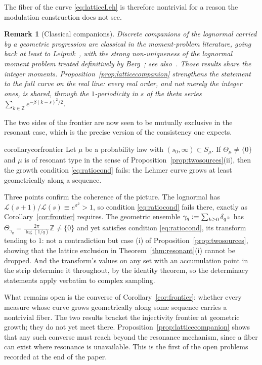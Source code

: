 \documentclass[sn-mathphys-num]{sn-jnl}
\theoremstyle{thmstyleone}%
\theoremstyle{thmstyletwo}%
\newtheorem{remark}{Remark}%
\theoremstyle{thmstylethree}%
\theoremstyle{thmstyleone}%
\providecommand{\Z}{\mathbb{Z}}
\providecommand{\Leh}{\mathscr{L}}
\providecommand{\eqdef}{\mathrel{\vcentcolon=}}
\begin{document}
	The fiber of the curve \eqref{eq:latticeLeh} is therefore
	nontrivial for a reason the modulation construction does not see.
	
	
	\begin{remark}[Classical companions]\label{rem:latticelit}
		Discrete companions of the lognormal carried by a geometric
		progression are classical in the moment-problem literature,
		going back at least to Leipnik~\cite{leipnik1982}, with the
		strong non-uniqueness of the lognormal moment problem treated
		definitively by Berg~\cite{berg1988}; see
		also~\cite{stoyanov2013,linstoyanov2017}. Those results share
		the integer moments. Proposition~\ref{prop:latticecompanion}
		strengthens the statement to the full curve on the real line:
		every real order, and not merely the integer ones, is shared,
		through the $1$-periodicity in $s$ of the theta series
		$\sum_{k\in\Z}e^{-\beta(k-s)^{2}/2}$.
	\end{remark}
	
	The two sides of the frontier are now seen to be mutually exclusive
	in the resonant case, which is the precise version of the consistency
	one expects.
	
	\begin{restatable}{corollary}{corfrontier}\label{cor:frontier}
		Let $\mu$ be a probability law with
		$(s_0,\infty)\subset S_\mu$. If $\Theta_\mu\neq\{0\}$ and
		$\mu$ is of resonant type in the sense of
		Proposition~\ref{prop:twosources}(ii), then the growth
		condition \eqref{eq:ratiocond} fails: the Lehmer curve grows
		at least geometrically along a sequence.
	\end{restatable}
	
	
	Three points confirm the coherence of the picture. The lognormal has
	$\Leh(s+1)/\Leh(s)\equiv e^{\sigma^2}>1$, so condition
	\eqref{eq:ratiocond} fails there, exactly as
	Corollary~\ref{cor:frontier} requires. The geometric ensemble
	$\gamma_q\eqdef\sum_{k\ge0}\delta_{q^{\,k}}$ has
	$\Theta_{\gamma_q}=\tfrac{2\pi}{\log(1/q)}\Z\neq\{0\}$ and
	yet satisfies condition \eqref{eq:ratiocond}, its transform tending
	to $1$: not a contradiction but case (i) of
	Proposition~\ref{prop:twosources}, showing that the lattice
	exclusion in Theorem~\ref{thm:resonant}(i) cannot be dropped. And
	the transform's values on any set with an accumulation point in the
	strip determine it throughout, by the identity theorem, so the
	determinacy statements apply verbatim to complex sampling.
	
	What remains open is the converse of Corollary~\ref{cor:frontier}:
	whether every measure whose curve grows geometrically along some
	sequence carries a nontrivial fiber. The two results bracket the
	injectivity frontier at geometric growth; they do not yet meet there.
	Proposition~\ref{prop:latticecompanion} shows that any such
	converse must reach beyond the resonance mechanism, since a fiber can exist where
	resonance is unavailable. This is the first of the open problems
	recorded at the end of the paper.
	
\end{document}
